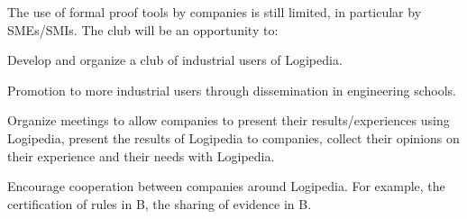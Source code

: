 \begin{workpackage}[id=dissemination,type=MGT,
  short={Dissemination},
  title={Dissemination, communication and exploitation},
  lead=Inr,InrRM=12,BirRM=4,IrtRM=4,ImtRM=2,StrRM=2,ZibRM=14,EduRM=12]
\begin{tasklist}
  \begin{task}[id=industrial-club,
    title=Expanding the use of Logipedia in the industry,
    lead=Irt,IrtRM=2,wphases=1-48!.05]
    The use of formal proof tools by companies is still limited, in particular by SMEs/SMIs. The club will be an opportunity to:
    \begin{compactitem}
    \item Develop and organize a club of industrial users of Logipedia.
    \item Promotion to more industrial users through dissemination in engineering schools.
    \item Organize meetings to allow companies to present their results/experiences using Logipedia, present the results of Logipedia to companies, collect their opinions on their experience and their needs with Logipedia.
    \item Encourage cooperation between companies around Logipedia. For example, the certification of rules in B, the sharing of evidence in B.
    \end{compactitem}
  \end{task}


\end{tasklist}
\end{workpackage}
